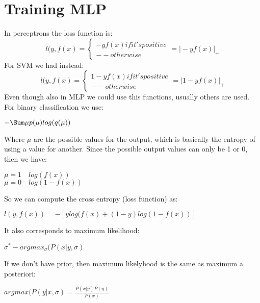 \section{Training MLP}
In perceptrons the loss function is:
\[l(y,f(x)=
\begin{cases}
	-yf(x) if it's positive\\
	-- otherwise
\end{cases}
=\vert -yf(x)\vert_+
\]
For SVM we had instead:
\[l(y,f(x)=
\begin{cases}
	1-yf(x) if it's positive\\
	-- otherwise
\end{cases}
=\vert 1-yf(x)\vert_+
\]
Even though also in MLP we could use this functions, usually others are used. \newline
For binary classification we use: 
\begin{center}
	$\displaystyle -\Sum\mu p(\mu)log(q(\mu))$
\end{center}
Where $\mu$ are the possible values for the output, which is basically the entropy of using a value for another. \newline
Since the possible output values can only be 1 or 0, then we have:
\begin{center}
	$\displaystyle \mu=1\quad log(f(x))$\\
	$\displaystyle \mu=0\quad log(1-f(x))$
\end{center}
So we can compute the cross entropy (loss function) as:
\begin{center}
	$\displaystyle l(y, f(x))=-[ylog(f(x)+(1-y)log(1-f(x))]$
\end{center}
It also corresponds to maximum likelihood:
\begin{center}
	$\displaystyle \sigma^*-argmax_\sigma(P(x\vert y, \sigma)$
\end{center}
If we don't have prior, then maximum likelyhood is the same as maximum a posteriori:
\begin{center}
	$\displaystyle argmax(P(y\vert x, \sigma)=\frac{P(x\vert y)P(y)}{P(x)}$
\end{center}
